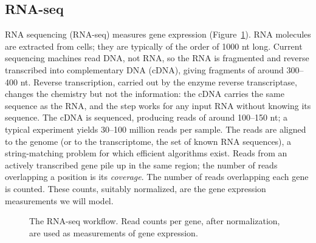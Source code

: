 \subsection{RNA-seq}

RNA sequencing (RNA-seq) measures gene expression (Figure~\ref{fig:rnaseq}). RNA molecules are extracted from cells; they are typically of the order of 1000 nt long. Current sequencing machines read DNA, not RNA, so the RNA is fragmented and reverse transcribed into complementary DNA (cDNA), giving fragments of around 300--400 nt. Reverse transcription, carried out by the enzyme reverse transcriptase, changes the chemistry but not the information: the cDNA carries the same sequence as the RNA, and the step works for any input RNA without knowing its sequence. The cDNA is sequenced, producing reads of around 100--150 nt; a typical experiment yields 30--100 million reads per sample. The reads are aligned to the genome (or to the transcriptome, the set of known RNA sequences), a string-matching problem for which efficient algorithms exist. Reads from an actively transcribed gene pile up in the same region; the number of reads overlapping a position is its \emph{coverage}. The number of reads overlapping each gene is counted. These counts, suitably normalized, are the gene expression measurements we will model.

\begin{figure}[t]
  \centering
  \caption{The RNA-seq workflow. Read counts per gene, after normalization, are used as measurements of gene expression.}
  \label{fig:rnaseq}
\end{figure}

